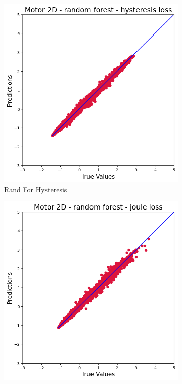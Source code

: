 \documentclass{article}
\begin{document}
\begin{figure}[!htbp]
    \vspace{0.3cm}
    
    \begin{subfigure}[b]{0.23\textwidth}
        \centering
        \includegraphics[width=\textwidth]{images/2D/rand_for_hysteresis.png}
        \caption{Rand For Hysteresis}
    \end{subfigure}
    \hfill
    \begin{subfigure}[b]{0.23\textwidth}
        \centering
        \includegraphics[width=\textwidth]{images/2D/rand_for_joule.png}

\end{subfigure}
\end{figure}
\end{document}
